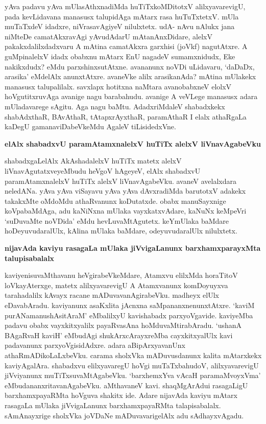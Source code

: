 yAva padavu yAva mUlasAthxnadiMda huTiTxkoMDitotxV alilxyavarevigU, pada kevLidavana manasusx talupidAga mAtarx rasa huTuTxtetxV. mUla muTaTxdeV idadxre, niVrasavAgiyeV nilulxtetx. udA- nAvu nAlukx jana niMteDe camatAkxravAgi yAvudAdarU mAtanAnxDidare, alelxV pakakxdalilxdadxvaru A mAtina camatAkxra garxhisi (joVkf) nagutAtxre. A guMpinalelxV idadx obabxnu mAtarx EnU nagadeV sumamxnidudx, Eke nakikxdudx? eMdu parxshinxsutAtxne. avananunx noVDi uLidavaru, `daDaDx, arasika' eMdelAlx anunxtAtxre. avaneVke alilx arasikanAda? mAtina mUlakekx manasusx talupalilalx. savxlapx hotitxna naMtara avanobabxneV elolxV hoVgutitxruvAga avanige nagu barabahudu. avanige A veVLege manasusx adara mUladavarege sAgitu. Aga nagu baMtu. AdadxriMdaleV shabadxkekx shabAdxthaR, BAvAthaR, tAtapxrAyxthaR, paramAthaR I elalx athaRgaLa kaDegU gamanaviDabeVkeMdu AgaleV tiLisidedxVne.

{\bf elAlx shabadxvU paramAtamxnalelxV huTiTx alelxV liVnavAgabeVku}

shabadxgaLelAlx AkAshadalelxV huTiTx matetx alelxV liVnavAgutatxveyeMbudu heVgoV hAgeyeV, elAlx shabadxvU paramAtamxnalelxV huTiTx alelxV liVnavAgabeVku. avaneV avelalxdara neledANa. yAva yAva viSayavu yAva yAva dAvxradiMda barutotxV adakekx takakxMte oMdoMdu athaRvanunx koDutatxde. obabx manuSayxnige koVpabaMdAga, adu kaNiNxna mUlaka vayxkatxvAdare, kaNuNx keMpeVri `suDuvaMte noVDida' eMdu hevLuvaMtAgutetx. keYmUlaka baMdare hoDeyuvudaralUlx, kAlina mUlaka baMdare, odeyuvudaralUlx nilulxtetx. 

{\bf nijavAda kaviyu rasagaLa mUlaka jiVvigaLanunx barxhamxparayxMta talupisabalalx}

kaviyenisuvaMthavanu heVgirabeVkeMdare, Atamxvu elilxMda horaTitoV loVkayAterxge, matetx alilxyavarevigU A Atamxvanunx komDoyuyxva tarahadalilx kAvayx racane mADuvavanAgirabeVku. madheyx elUlx eDavabAradu. kaviyanunx asaKxlita jAcnxna saMpananxnenunxtAtxre. `kaviM purANamanushAsitAraM' eMbalilxyU kavishabadx parxyoVgavide. kaviyeMba padavu obabx vayxkitxyalilx payaRvasAna hoMduvaMtirabAradu. `ushanA BAgaRvaH kaviH' eMbudAgi shukArxcArayxreMba cayxkitxyalUlx kavi padavanunx parxyoVgisidAdxre. adara aBipArxyavanUnx athaRmADikoLaLxbeVku. carama sholxVka mADuvusdanunx kalita mAtarxkekx kaviyAgalAra. shabadxvu elilxyavaregU hoVgi muTaTxbahudoV, alilxyavarevigU jiVviyanunx muTiTxsuvaMtAgabeVku. `barxhemxYva vAcaH paramaMvoyxVma' eMbudananxritavanAgabeVku. aMthavaneV kavi. shaqMgArAdui rasagaLigU barxhamxpayaRMta hoVguva shakitx ide. Adare nijavAda kaviyu mAtarx rasagaLa mUlaka jiVvigaLanunx barxhamxpayaRMta talapisabalalx. sAmAnayxrige sholxVka joVDaNe mADuvavarigelAlx adu sAdhayxvAgadu.

